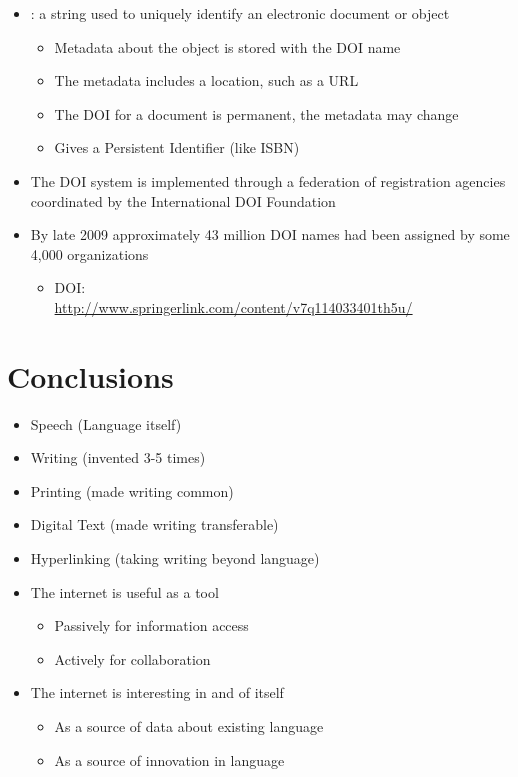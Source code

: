 \documentclass[a4paper,landscape,headrule,footrule,xetex]{foils}
\begin{document}
\begin{itemize}
  \item {}: a string used to uniquely identify an electronic document or object
  \begin{itemize}
  \item Metadata  about the object is stored with the DOI name
  \item The metadata includes a location, such as a URL
  \item The DOI for a document is permanent,  the metadata may change
  \item Gives a Persistent Identifier (like ISBN)
  \end{itemize}
\item  The DOI system is implemented through a federation of registration agencies coordinated by the International DOI Foundation
\item By late 2009 approximately 43 million DOI names had been assigned by some 4,000 organizations
\begin{itemize}
\item DOI:  
\\ \url{http://www.springerlink.com/content/v7q114033401th5u/}
\end{itemize}
\end{itemize}





\section{Conclusions}

\begin{itemize}
  \item Speech (Language itself)
  \item Writing (invented 3-5 times)
  \item Printing  (made writing common)
  \item Digital Text (made writing transferable) 
  \item Hyperlinking (taking writing beyond language) 
  \end{itemize}


\begin{itemize}
\item The internet is useful as a tool
  \begin{itemize}
  \item Passively for information access
  \item Actively for collaboration
  \end{itemize}
\item The internet is interesting in and of itself
  \begin{itemize}
  \item As a source of data about existing language
  \item As a source of innovation in language
  \end{itemize}
\end{itemize}
\end{document}
